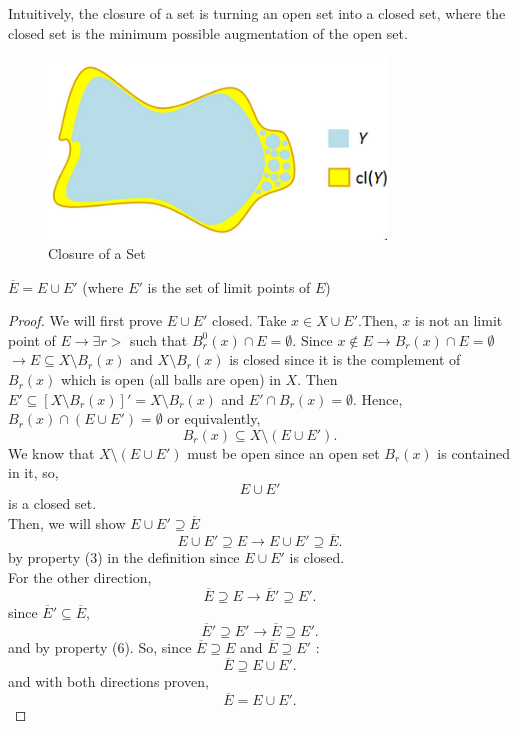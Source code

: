 \documentclass[a4paper]{article}
\begin{document}
\begin{remark}
  Intuitively, the closure of a set is turning an open set into a closed set, where the closed set is the minimum
  possible augmentation of the open set.
\end{remark}

\begin{figure}[h]
  \centering
  \includegraphics[width=0.8\textwidth]{assets/closure_ex.png}
  \caption{Closure of a Set}
  \label{fig:closure_ex}
\end{figure}

\begin{prop} $\overline{E} = E \cup E'$ (where $E'$ is the set of limit points of  $E$) 
  \begin{proof} We will first prove $E \cup E'$ closed. Take $x \in X \cup E'$.Then,  $x$ is not 
         an limit point of  $E \to \exists r >$ such that $B_r^{0} (x) \cap E = \emptyset$. 
         Since $x \not\in E \to B_r(x) \cap E = \emptyset$ $\to E \subseteq X \setminus B_r(x)$ and $X \setminus B_r(x)$ is closed
         since it is the complement of $B_r(x)$ which is open (all balls are open) in $X$. Then 
         $E' \subseteq [X \setminus B_r(x)]' = X \setminus B_r(x)$ and $E' \cap B_r(x) = \emptyset$.
         Hence, $B_r(x) \cap (E \cup E') = \emptyset$ or equivalently,
          \[
         B_r(x) \subseteq X \setminus (E \cup E')
         .\]
         We know that $X \setminus (E \cup E')$ must be open since an open set $B_r(x)$ is contained in it,
         so,
          \[
         E \cup E'
         \]
         is a closed set.\\ 

         Then, we will show  $E \cup E' \supseteq \overline{E}$
         \[
         E \cup E' \supseteq E \to E \cup E' \supseteq \overline{E}
         .\] 
         by property (3) in the definition since $E \cup E'$ is closed. \\


         For the other direction, 
         \[
           \overline{E} \supseteq E \to \overline{E}' \supseteq E' 
         .\] 
         since $\overline{E}' \subseteq \overline{E}$,
         \[
         \overline{E}' \supseteq E' \to \overline{E} \supseteq E'
         .\] 
         and by property (6). So, 
         since $\overline{E} \supseteq E$ and $\overline{E} \supseteq E'$ :
         \[
         \overline{E} \supseteq E \cup E'
         .\] and with both directions proven, 
         \[
         \overline{E} = E \cup E'
         .\] 
  \end{proof}
\end{prop}
\end{document}
